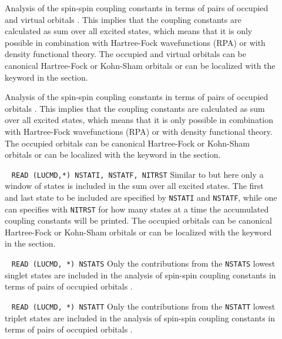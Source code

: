 \begin{description}
\item []
Analysis of the spin-spin coupling constants in terms of pairs of
occupied and virtual orbitals \cite{spas079,spas086}. This implies that
the coupling constants are calculated as sum over all excited states,
which means that it is only possible in combination with Hartree-Fock
wavefunctions (RPA) or with density functional theory. The occupied and
virtual orbitals can be canonical Hartree-Fock or Kohn-Sham orbitals or
can be localized with the  keyword in the 
section.

\item []
Analysis of the spin-spin coupling constants in terms of pairs of
occupied orbitals \cite{spas079,spas086}. This implies that the
coupling constants are calculated as sum over all excited states, which
means that it is only possible in combination with Hartree-Fock
wavefunctions (RPA) or with density functional theory. The occupied
orbitals can be canonical Hartree-Fock or Kohn-Sham orbitals or can be
localized with the  keyword in the 
section.

\item []\verb| |\newline
  \verb|READ (LUCMD,*) NSTATI, NSTATF, NITRST|\newline
Similar to  but here only a window of states is included in
the sum over all excited states. The first and last state to be
included are specified by \verb|NSTATI| and \verb|NSTATF|, while one
can specifies with \verb|NITRST| for how many states at a time the
accumulated coupling constants will be printed. The occupied orbitals
can be canonical Hartree-Fock or Kohn-Sham orbitals or can be localized
with the  keyword in the  section.

\item []\verb| |\newline
 \verb|READ (LUCMD, *) NSTATS|\newline
Only the contributions from the \verb|NSTATS| lowest singlet states are
included in the analysis of spin-spin coupling constants in terms of
pairs of occupied orbitals \cite{spas079,spas086}.

\item []\verb| |\newline
 \verb|READ (LUCMD, *) NSTATT|\newline
 Only the contributions from the \verb|NSTATT| lowest triplet states are
 included in the analysis of spin-spin coupling constants in terms of
pairs of occupied orbitals \cite{spas079,spas086}.
\end{description}

